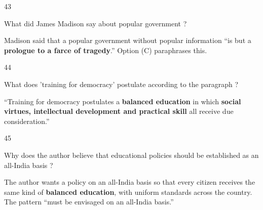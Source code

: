 \begin{question}{43}
{What did James Madison say about popular government ?\par}
\begin{explain}
Madison said that a popular government without popular information ``is but a \textbf{prologue to a farce of tragedy}.'' Option (C) paraphrases this.
\end{explain}
\end{question}

\begin{question}{44}
{What does 'training for democracy' postulate according to the paragraph ?\par}
\begin{explain}
``Training for democracy postulates a \textbf{balanced education} in which \textbf{social virtues, intellectual development and practical skill} all receive due consideration.''
\end{explain}
\end{question}

\begin{question}{45}
{Why does the author believe that educational policies should be established as an all-India basis ?\par}
\begin{explain}
The author wants a policy on an all-India basis so that every citizen receives the same kind of \textbf{balanced education}, with uniform standards across the country. The pattern ``must be envisaged on an all-India basis.''
\end{explain}
\end{question}

